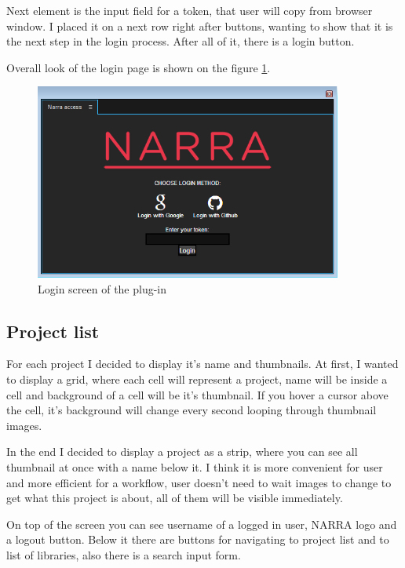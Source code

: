 \documentclass[thesis=B,english]{FITthesis}[2012/10/20]
\begin{document}
Next element is the input field for a token, that user will copy from browser window. I placed it on a next row right after buttons, wanting to show that it is the next step in the login process. After all of it, there is a login button.

Overall look of the login page is shown on the figure \ref{fig:login}.
	\begin{figure}
		\centering
		\includegraphics[width=0.9\textwidth]{LoginPage.png}
		\caption{Login screen of the plug-in}\label{fig:login}
	\end{figure}
\subsection{Project list}
For each project I decided to display it's name and thumbnails. At first, I wanted to display a grid, where each cell will represent a project, name will be inside a cell and background of a cell will be it's thumbnail. If you hover a cursor above the cell, it's background will change every second looping through thumbnail images.

In the end I decided to display a project as a strip, where you can see all thumbnail at once with a name below it. I think it is more convenient for user and more efficient for a workflow, user doesn't need to wait images to change to get what this project is about, all of them will be visible immediately.

On top of the screen you can see username of a logged in user, NARRA logo and a logout button. Below it there are buttons for navigating to project list and to list of libraries, also there is a search input form.
\end{document}
